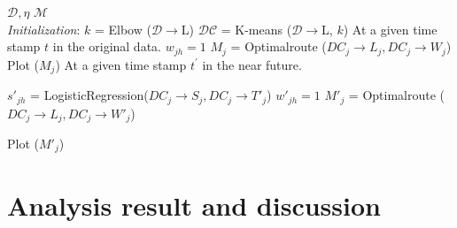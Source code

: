 \documentclass[conference,compsoc]{IEEEtran}
\begin{document}
\begin{algorithm}
	\caption{}
	\begin{algorithmic}[1]
		\renewcommand{\algorithmicrequire}{\textbf{Input:}}
		\renewcommand{\algorithmicensure}{\textbf{Output:}}
		\REQUIRE $\mathcal{D}, \eta$
		\ENSURE  $\mathcal{M}$
		\\ \textit{Initialization}: 
		\STATE $k$ = Elbow ($\mathcal{D}\rightarrow$L)
		\STATE $\mathcal{DC}$ = K-means ($\mathcal{D}\rightarrow$L, $k$)
		\STATE At a given time stamp $t$ in the original data.
		\STATE $w_{jh} = 1$
		\STATE $M_j$ = Optimalroute ($DC_j \rightarrow L_j, DC_j \rightarrow W_j$)
		\ENDIF
		\ENDFOR
		\STATE Plot ($M_j$)
		\ENDFOR
	\STATE At a given time stamp $t^{'}$ in the near future.

\STATE $s'_{jh}$ = LogisticRegression($DC_j \rightarrow S_j, DC_j \rightarrow T'_j$)
\STATE $w'_{jh} = 1$
\STATE $M'_j$ = Optimalroute ($DC_j \rightarrow L_j, DC_j \rightarrow W'_j$)
\ENDIF

\ENDFOR
\STATE Plot ($M'_j$)
\ENDFOR

	\end{algorithmic} 
\label{algorithm1}
\end{algorithm}


\section{Analysis result and discussion}
%
%
 
\end{document}
